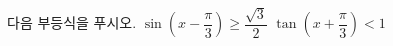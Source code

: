 다음 부등식을 푸시오. 
 $\sin\left(x-\dfrac{\pi}{3}\right)\ge\dfrac{\sqrt{3}}{2}$
 $\tan\left(x+\dfrac{\pi}{3}\right)<1$

